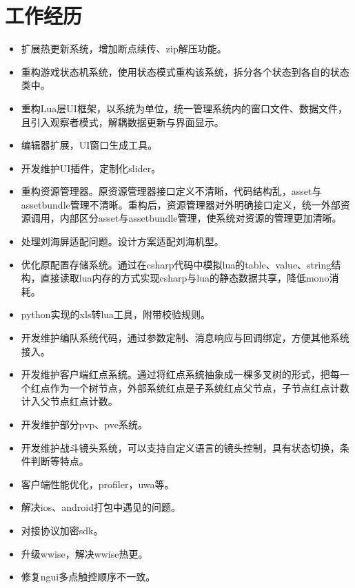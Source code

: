 \documentclass{resume}
\begin{document}
\section{工作经历}
\begin{itemize}
  \item 扩展热更新系统，增加断点续传、zip解压功能。
  \item 重构游戏状态机系统，使用状态模式重构该系统，拆分各个状态到各自的状态类中。
  \item 重构Lua层UI框架，以系统为单位，统一管理系统内的窗口文件、数据文件，且引入观察者模式，解耦数据更新与界面显示。
  \item 编辑器扩展，UI窗口生成工具。
  \item 开发维护UI插件，定制化slider。
  \item 重构资源管理器。原资源管理器接口定义不清晰，代码结构乱，asset与assetbundle管理不清晰。重构后，资源管理器对外明确接口定义，统一外部资源调用，内部区分asset与assetbundle管理，使系统对资源的管理更加清晰。
  \item 处理刘海屏适配问题。设计方案适配刘海机型。
  \item 优化原配置存储系统。通过在csharp代码中模拟lua的table、value、string结构，直接读取lua内存的方式实现csharp与lua的静态数据共享，降低mono消耗。
  \item python实现的xls转lua工具，附带校验规则。
  \item 开发维护编队系统代码，通过参数定制、消息响应与回调绑定，方便其他系统接入。
  \item 开发维护客户端红点系统。通过将红点系统抽象成一棵多叉树的形式，把每一个红点作为一个树节点，外部系统红点是子系统红点父节点，子节点红点计数计入父节点红点计数。
  \item 开发维护部分pvp、pve系统。
  \item 开发维护战斗镜头系统，可以支持自定义语言的镜头控制，具有状态切换，条件判断等特点。
  \item 客户端性能优化，profiler，uwa等。
  \item 解决ios、android打包中遇见的问题。
  \item 对接协议加密sdk。
  \item 升级wwise，解决wwise热更。
  \item 修复ngui多点触控顺序不一致。
\end{itemize}


%
%
\end{document}
